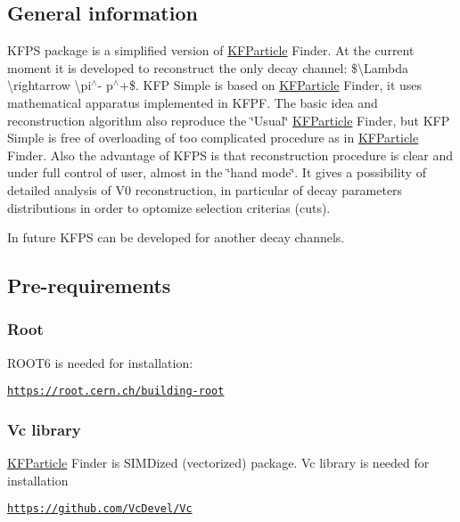 \subsection*{General information}

K\+F\+PS package is a simplified version of \hyperlink{classKFParticle}{K\+F\+Particle} Finder. At the current moment it is developed to reconstruct the only decay channel\+: \${\ttfamily \textbackslash{}Lambda} {\ttfamily \textbackslash{}rightarrow} {\ttfamily \textbackslash{}pi$^\wedge$-\/} {\ttfamily p$^\wedge$+}\$. K\+FP Simple is based on \hyperlink{classKFParticle}{K\+F\+Particle} Finder, it uses mathematical apparatus implemented in K\+F\+PF. The basic idea and reconstruction algorithm also reproduce the \char`\"{}\+Usual\char`\"{} \hyperlink{classKFParticle}{K\+F\+Particle} Finder, but K\+FP Simple is free of overloading of too complicated procedure as in \hyperlink{classKFParticle}{K\+F\+Particle} Finder. Also the advantage of K\+F\+PS is that reconstruction procedure is clear and under full control of user, almost in the \char`\"{}hand mode\char`\"{}. It gives a possibility of detailed analysis of V0 reconstruction, in particular of decay parameters distributions in order to optomize selection criterias (cuts).

In future K\+F\+PS can be developed for another decay channels.

\subsection*{Pre-\/requirements}

\subsubsection*{Root}

R\+O\+O\+T6 is needed for installation\+:

\href{https://root.cern.ch/building-root}{\tt https\+://root.\+cern.\+ch/building-\/root}

\subsubsection*{Vc library}

\hyperlink{classKFParticle}{K\+F\+Particle} Finder is S\+I\+MD\textquotesingle{}ized (vectorized) package. Vc library is needed for installation

\href{https://github.com/VcDevel/Vc}{\tt https\+://github.\+com/\+Vc\+Devel/\+Vc} 



